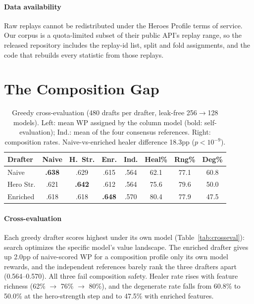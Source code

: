 \documentclass[journal]{IEEEtran}
\begin{document}
\paragraph{Data availability} Raw replays cannot be redistributed under the Heroes Profile terms of service. Our corpus is a quota-limited subset of their public API's replay range, so the released repository includes the replay-id list, split and fold assignments, and the code that rebuilds every statistic from those replays.

\section{The Composition Gap}
\label{sec:gap}

\begin{table}[t]
\centering
\caption{Greedy cross-evaluation (480 drafts per drafter, leak-free 256$\to$128 models). Left: mean WP assigned by the column model (bold: self-evaluation); Ind.: mean of the four consensus references. Right: composition rates. Naive-vs-enriched healer difference 18.3pp ($p < 10^{-9}$).}
\label{tab:crosseval}\label{tab:comp}
\setlength{\tabcolsep}{3.3pt}
\begin{tabular}{lcccc|ccc}
\toprule
Drafter & Naive & H.~Str. & Enr. & Ind. & Heal\% & Rng\% & Deg\% \\
\midrule
Naive & \textbf{.638} & .629 & .615 & .564 & 62.1 & 77.1 & 60.8 \\
Hero Str. & .621 & \textbf{.642} & .612 & .564 & 75.6 & 79.6 & 50.0 \\
Enriched & .618 & .618 & \textbf{.648} & .570 & 80.4 & 77.9 & 47.5 \\
\bottomrule
\end{tabular}
\end{table}

\paragraph{Cross-evaluation} Each greedy drafter scores highest under its own model (Table~\ref{tab:crosseval}): search optimizes the specific model's value landscape. The enriched drafter gives up 2.0pp of naive-scored WP for a composition profile only its own model rewards, and the independent references barely rank the three drafters apart (0.564--0.570). All three fail composition safety. Healer rate rises with feature richness (62\% $\to$ 76\% $\to$ 80\%), and the degenerate rate falls from 60.8\% to 50.0\% at the hero-strength step and to 47.5\% with enriched features.
\end{document}
